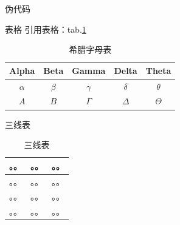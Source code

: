 \documentclass{beamer}
\begin{document}
\begin{frame}{伪代码}

\end{frame}


\begin{frame}{表格}
引用表格：tab.\ref{tab:Greek}
\begin{table}[H]
\begin{centering}
\begin{tabular}{|c|c|c|c|c|}
\hline
Alpha & Beta & Gamma & Delta & Theta\\
\hline
$\alpha$ & $\beta$ & $\gamma$ & $\delta$ & $\theta$\\
\hline
$A$ & $B$ & $\Gamma$ & $\Delta$ & $\Theta$\\
\hline
\end{tabular}
\par\end{centering}
\protect\caption{希腊字母表\label{tab:Greek}}
\end{table}
\end{frame}

\begin{frame}{三线表}
\begin{table}[htbp]
 \caption{\label{tab:test}三线表}
 \begin{tabular}{lcl}
  \toprule
  。。 & 。。 & 。。 \\
  \midrule
 。。 & 。。 & 。。 \\
 。。 & 。。 & 。。 \\
 。。 & 。。 & 。。 \\
 \bottomrule
 \end{tabular}
\end{table}
\end{frame}
\end{document}
